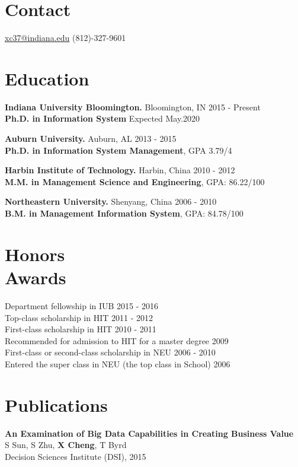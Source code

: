 \documentclass[11pt,margin,line]{res}
\begin{document}

\begin{resume}

\section{Contact}
\hfill \href{mailto:xc37@indiana.edu}{xc37@indiana.edu} \hfill (812)-327-9601  %

\section{Education}
{\bf Indiana University Bloomington.} Bloomington, IN       \hfill 2015 - Present\\
{\bf Ph.D. in Information System}  \hfill Expected May.2020

{\bf Auburn University.} Auburn, AL \hfill 2013 - 2015\\
{\bf Ph.D. in Information System Management}, GPA 3.79/4 

{\bf Harbin Institute of Technology.} Harbin, China \hfill 2010 - 2012\\
{\bf M.M. in Management Science and Engineering}, GPA: 86.22/100 

{\bf Northeastern University.} Shenyang, China \hfill 2006 - 2010\\
{\bf B.M. in Management Information System}, GPA: 84.78/100

\section{Honors\\Awards}
Department fellowship in IUB \hfill 2015 - 2016\\
Top-class scholarship in HIT \hfill 2011 - 2012\\
First-class scholarship in HIT \hfill 2010 - 2011\\
Recommended for admission to HIT for a master degree \hfill 2009\\
First-class or second-class scholarship in NEU \hfill 2006 - 2010\\
Entered the super class in NEU (the top class in School) \hfill 2006

\section{Publications}
{\bf An Examination of Big Data Capabilities in Creating Business Value}\\
S Sun, S Zhu, {\bf X Cheng}, T Byrd\\
Decision Sciences Institute (DSI), 2015


\end{resume}
\end{document}
